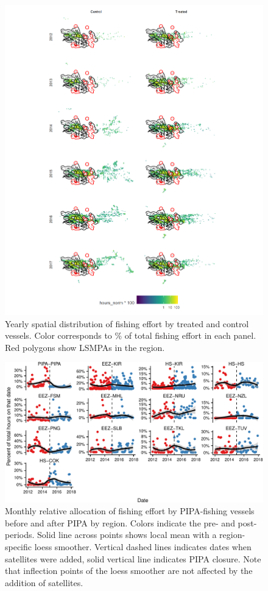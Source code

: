\documentclass[9p,twocolumn,twoside,lineno]{pnas-new}
\begin{document}
\begin{figure}
\centering
\includegraphics{img/fishing_raster.png}
\caption{\label{fig:fishing_raster}Yearly
spatial distribution of fishing effort by treated and control vessels.
Color corresponds to \% of total fishing effort in each panel.
Red polygons show LSMPAs in the region.}
\end{figure}

\begin{figure}
\centering
\includegraphics{img/redist_trend.pdf}
\caption{\label{fig:redist_trend}Monthly
relative allocation of fishing effort by PIPA-fishing vessels before and
after PIPA by region. Colors indicate the pre- and post- periods. Solid line
across points shows local mean with a region-specific loess smoother.
Vertical dashed lines indicates dates when satellites were added, solid vertical
line indicates PIPA closure. Note that inflection points of
the loess smoother are not affected by the addition of satellites.}
\end{figure}
\end{document}
